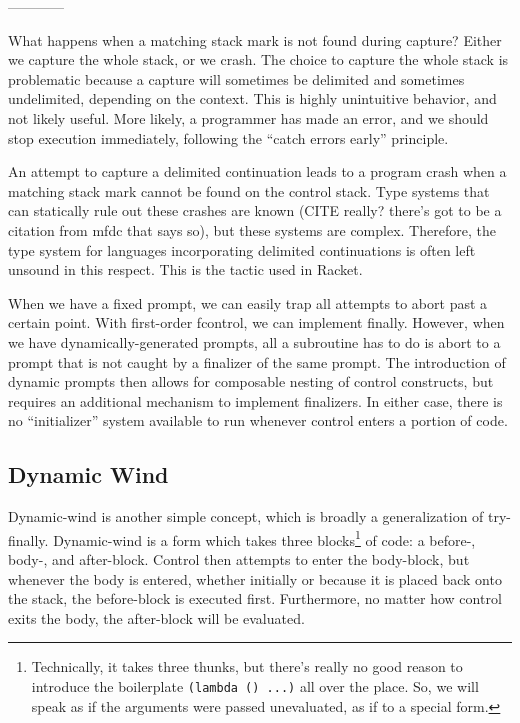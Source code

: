 \documentclass[11pt]{article}
\begin{document}
------------

What happens when a matching stack mark is not found during capture?
Either we capture the whole stack, or we crash.
The choice to capture the whole stack is problematic because a capture will sometimes be delimited and sometimes undelimited, depending on the context.
This is highly unintuitive behavior, and not likely useful.
More likely, a programmer has made an error, and we should stop execution immediately, following the ``catch errors early'' principle.

An attempt to capture a delimited continuation leads to a program crash when a matching stack mark cannot be found on the control stack.
Type systems that can statically rule out these crashes are known (CITE really? there's got to be a citation from mfdc that says so), but these systems are complex.
Therefore, the type system for languages incorporating delimited continuations is often left unsound in this respect.
This is the tactic used in Racket.

When we have a fixed prompt, we can easily trap all attempts to abort past a certain point.
With first-order fcontrol, we can implement finally.
However, when we have dynamically-generated prompts, all a subroutine has to do is abort to a prompt that is not caught by a finalizer of the same prompt.
The introduction of dynamic prompts then allows for composable nesting of control constructs, but requires an additional mechanism to implement finalizers.
In either case, there is no ``initializer'' system available to run whenever control enters a portion of code.



\subsection{Dynamic Wind}
\label{dynamic-wind}

Dynamic-wind is another simple concept, which is broadly a generalization of try-finally.
Dynamic-wind is a form which takes three blocks\footnote{Technically, it takes three thunks, but there's really no good reason to introduce the boilerplate \texttt{(lambda () ...)} all over the place. So, we will speak as if the arguments were passed unevaluated, as if to a special form.} of code: a before-, body-, and after-block.
Control then attempts to enter the body-block, but whenever the body is entered, whether initially or because it is placed back onto the stack, the before-block is executed first.
Furthermore, no matter how control exits the body, the after-block will be evaluated.
\end{document}
